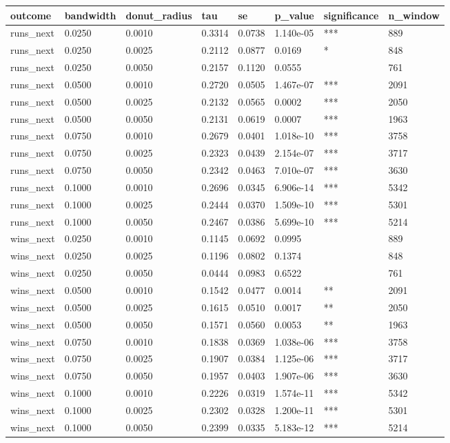 \begin{tabular}{llllllll}
\toprule
outcome & bandwidth & donut\_radius & tau & se & p\_value & significance & n\_window \\
\midrule
runs\_next & 0.0250 & 0.0010 & 0.3314 & 0.0738 & 1.140e-05 & *** & 889 \\
runs\_next & 0.0250 & 0.0025 & 0.2112 & 0.0877 & 0.0169 & * & 848 \\
runs\_next & 0.0250 & 0.0050 & 0.2157 & 0.1120 & 0.0555 &  & 761 \\
runs\_next & 0.0500 & 0.0010 & 0.2720 & 0.0505 & 1.467e-07 & *** & 2091 \\
runs\_next & 0.0500 & 0.0025 & 0.2132 & 0.0565 & 0.0002 & *** & 2050 \\
runs\_next & 0.0500 & 0.0050 & 0.2131 & 0.0619 & 0.0007 & *** & 1963 \\
runs\_next & 0.0750 & 0.0010 & 0.2679 & 0.0401 & 1.018e-10 & *** & 3758 \\
runs\_next & 0.0750 & 0.0025 & 0.2323 & 0.0439 & 2.154e-07 & *** & 3717 \\
runs\_next & 0.0750 & 0.0050 & 0.2342 & 0.0463 & 7.010e-07 & *** & 3630 \\
runs\_next & 0.1000 & 0.0010 & 0.2696 & 0.0345 & 6.906e-14 & *** & 5342 \\
runs\_next & 0.1000 & 0.0025 & 0.2444 & 0.0370 & 1.509e-10 & *** & 5301 \\
runs\_next & 0.1000 & 0.0050 & 0.2467 & 0.0386 & 5.699e-10 & *** & 5214 \\
wins\_next & 0.0250 & 0.0010 & 0.1145 & 0.0692 & 0.0995 &  & 889 \\
wins\_next & 0.0250 & 0.0025 & 0.1196 & 0.0802 & 0.1374 &  & 848 \\
wins\_next & 0.0250 & 0.0050 & 0.0444 & 0.0983 & 0.6522 &  & 761 \\
wins\_next & 0.0500 & 0.0010 & 0.1542 & 0.0477 & 0.0014 & ** & 2091 \\
wins\_next & 0.0500 & 0.0025 & 0.1615 & 0.0510 & 0.0017 & ** & 2050 \\
wins\_next & 0.0500 & 0.0050 & 0.1571 & 0.0560 & 0.0053 & ** & 1963 \\
wins\_next & 0.0750 & 0.0010 & 0.1838 & 0.0369 & 1.038e-06 & *** & 3758 \\
wins\_next & 0.0750 & 0.0025 & 0.1907 & 0.0384 & 1.125e-06 & *** & 3717 \\
wins\_next & 0.0750 & 0.0050 & 0.1957 & 0.0403 & 1.907e-06 & *** & 3630 \\
wins\_next & 0.1000 & 0.0010 & 0.2226 & 0.0319 & 1.574e-11 & *** & 5342 \\
wins\_next & 0.1000 & 0.0025 & 0.2302 & 0.0328 & 1.200e-11 & *** & 5301 \\
wins\_next & 0.1000 & 0.0050 & 0.2399 & 0.0335 & 5.183e-12 & *** & 5214 \\
\bottomrule
\end{tabular}
